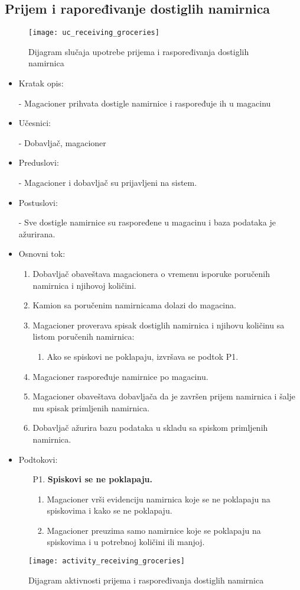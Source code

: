 
\subsection{Prijem i rapoređivanje dostiglih namirnica}
\begin{figure}[h]
	\begin{center}
		\texttt{[image: uc\_receiving\_groceries]}
	\end{center}
	\caption{Dijagram slučaja upotrebe prijema i raspoređivanja dostiglih namirnica}
\end{figure}
	\begin{itemize}
		\item{Kratak opis:} 
		
		- Magacioner prihvata dostigle namirnice i raspoređuje ih u magacinu
		\item{Učesnici:} 
		
		- Dobavljač, magacioner
		\item{Preduslovi:}
		
		- Magacioner i dobavljač su prijavljeni na sistem.
		\item{Postuslovi:}
		
		- Sve dostigle namirnice su raspoređene u magacinu i baza podataka je ažurirana.
		\item{Osnovni tok:}
		\begin{enumerate}
			\item{Dobavljač obaveštava magacionera o vremenu isporuke poručenih namirnica i njihovoj količini.}
			\item{Kamion sa poručenim namirnicama dolazi do magacina.}
			\item{Magacioner proverava spisak dostiglih namirnica i njihovu količinu sa listom poručenih namirnica:}
			\begin{enumerate}
			\item{Ako se spiskovi ne poklapaju, izvršava se podtok P1.}
			\end{enumerate}
			\item{Magacioner raspoređuje namirnice po magacinu.}
			\item{Magacioner obaveštava dobavljača da je završen prijem namirnica i šalje mu spisak primljenih namirnica.}
			\item{Dobavljač ažurira bazu podataka u skladu sa spiskom primljenih namirnica.}
		\end{enumerate}
		
		\item{Podtokovi:}
			\begin{enumerate}
				\item[P1.] \textbf{Spiskovi se ne poklapaju.} 
				\begin{enumerate}
				\item{Magacioner vrši evidenciju namirnica koje se ne poklapaju na spiskovima i kako se ne poklapaju.}
				\item{Magacioner preuzima samo namirnice koje se poklapaju na spiskovima i u potrebnoj količini ili manjoj.}
				\end{enumerate}
			\end{enumerate}
	\end{itemize}
\begin{figure}[h]
	\begin{center}
		\texttt{[image: activity\_receiving\_groceries]}
		\caption{Dijagram aktivnosti prijema i raspoređivanja dostiglih namirnica}
	\end{center}
\end{figure}
